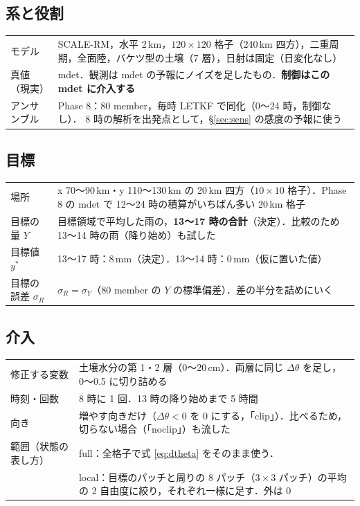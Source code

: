 \documentclass[dvipdfmx,a4paper,10.5pt]{jarticle}
\numberwithin{equation}{section}
\begin{document}
\subsection{系と役割}
\begin{center}
\begin{tabular}{p{}p{}}\toprule
モデル & SCALE-RM，水平 2\,km，$120\times120$ 格子（240\,km 四方），二重周期，全面陸，バケツ型の土壌（7 層），日射は固定（日変化なし） \\
真値（現実） & mdet．観測は mdet の予報にノイズを足したもの．\textbf{制御はこの mdet に介入する} \\
アンサンブル & Phase 8：80 member，毎時 LETKF で同化（0〜24 時，制御なし）．
              8 時の解析を出発点として，\S\ref{sec:sens} の感度の予報に使う \\ \bottomrule
\end{tabular}
\end{center}

\subsection{目標}
\begin{center}
\begin{tabular}{p{}p{}}\toprule
場所 & x 70〜90\,km・y 110〜130\,km の 20\,km 四方（$10\times10$ 格子）．Phase 8 の mdet で 12〜24 時の積算がいちばん多い 20\,km 格子 \\
目標の量 $Y$ & 目標領域で平均した雨の，\textbf{13〜17 時の合計}（決定）．比較のため 13〜14 時の雨（降り始め）も試した \\
目標値 $y^*$ & 13〜17 時：8\,mm（決定）．13〜14 時：0\,mm（仮に置いた値） \\
目標の誤差 $\sigma_R$ & $\sigma_R=\sigma_Y$（80 member の $Y$ の標準偏差）．差の半分を詰めにいく \\ \bottomrule
\end{tabular}
\end{center}

\subsection{介入}
\begin{center}
\begin{tabular}{p{}p{}}\toprule
修正する変数 & 土壌水分の第 1・2 層（0〜20\,cm）．両層に同じ $\Delta\theta$ を足し，0〜0.5 に切り詰める \\
時刻・回数 & 8 時に 1 回．13 時の降り始めまで 5 時間 \\
向き & 増やす向きだけ（$\Delta\theta<0$ を 0 にする，「clip」）．比べるため，切らない場合（「noclip」）も流した \\
範囲（状態の表し方） & full：全格子で式 \eqref{eq:dtheta} をそのまま使う．\\
 & local：目標のパッチと周りの 8 パッチ（$3\times3$ パッチ）の平均の 2 自由度に絞り，それぞれ一様に足す．外は 0 \\ \bottomrule
\end{tabular}
\end{center}
\end{document}
